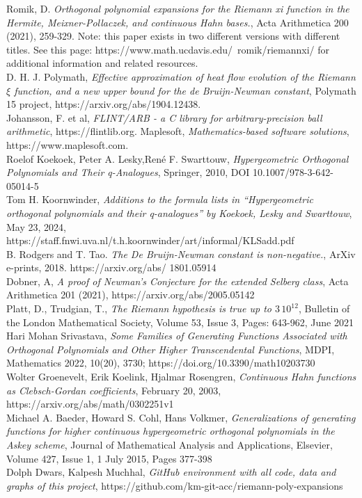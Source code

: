 \documentclass[a4paper,11pt,twoside]{amsart}
\begin{document}
\begin{thebibliography}{} 
Romik, D. \emph{Orthogonal polynomial expansions for the Riemann xi function in the Hermite, Meixner-Pollaczek, and continuous Hahn bases.}, Acta Arithmetica 200 (2021), 259-329.
Note: this paper exists in two different versions with different titles. See this page: https://www.math.ucdavis.edu/~romik/riemannxi/ for additional information and related resources. \\
D. H. J. Polymath, \emph{Effective approximation of heat flow evolution of the Riemann $\xi$ function, and a new upper bound for the de Bruijn-Newman constant}, Polymath 15 project, https://arxiv.org/abs/1904.12438.\\
Johansson, F. et al, \emph{FLINT/ARB - a C library for arbitrary-precision ball arithmetic}, https://flintlib.org.
Maplesoft, \emph{Mathematics-based software solutions}, https://www.maplesoft.com.\\
Roelof Koekoek, Peter A. Lesky,René F. Swarttouw, \emph{Hypergeometric Orthogonal Polynomials and Their q-Analogues}, Springer, 2010, DOI 10.1007/978-3-642-05014-5\\
Tom H. Koornwinder, \emph{Additions to the formula lists in “Hypergeometric orthogonal polynomials and their q-analogues” by Koekoek, Lesky and Swarttouw}, May 23, 2024, https://staff.fnwi.uva.nl/t.h.koornwinder/art/informal/KLSadd.pdf\\
B. Rodgers and T. Tao. \emph{The De Bruijn-Newman constant is non-negative.}, ArXiv e-prints, 2018. https://arxiv.org/abs/ 1801.05914\\
Dobner, A, \emph{A proof of Newman’s Conjecture for the extended Selberg class}, Acta Arithmetica 201 (2021), https://arxiv.org/abs/2005.05142\\
Platt, D., Trudgian, T., \emph{The Riemann hypothesis is true up to $3\,10^{12}$}, Bulletin of the London Mathematical Society, Volume 53, Issue 3, Pages: 643-962, June 2021\\
Hari Mohan Srivastava, \emph{Some Families of Generating Functions Associated with Orthogonal Polynomials and Other Higher Transcendental Functions}, MDPI, Mathematics 2022, 10(20), 3730; https://doi.org/10.3390/math10203730\\
Wolter Groenevelt, Erik Koelink, Hjalmar Rosengren, \emph{Continuous Hahn functions as Clebsch-Gordan coefficients}, February 20, 2003, https://arxiv.org/abs/math/0302251v1\\
Michael A. Baeder, Howard S. Cohl, Hans Volkmer, \emph{Generalizations of generating functions for higher continuous hypergeometric orthogonal polynomials in the Askey scheme}, Journal of Mathematical Analysis and Applications, Elsevier, Volume 427, Issue 1, 1 July 2015, Pages 377-398\\
Dolph Dwars, Kalpesh Muchhal, \emph{GitHub environment with all code, data and graphs of this project}, https://github.com/km-git-acc/riemann-poly-expansions
\end{thebibliography}{} 
\end{document}
